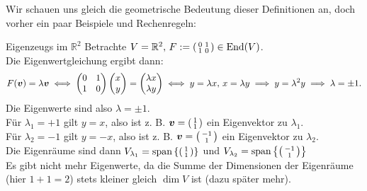 Wir schauen uns gleich die geometrische Bedeutung dieser Definitionen an, doch vorher ein paar Beispiele und Rechenregeln:
\begin{Beispiel}{Eigenzeugs im $\mathbb{R}^2$}
Betrachte $V=\mathbb{R}^2,\, F:=\left(\begin{smallmatrix}0&1\\1&0\end{smallmatrix}\right)\in \text{End}(V)$.\\
Die Eigenwertgleichung ergibt dann:
\begin{equation*}
F({\text{\boldmath${v}$}})=\lambda {\text{\boldmath${v}$}}\iff \begin{pmatrix}0&1\\1&0\end{pmatrix}\begin{pmatrix}x\\y\end{pmatrix}=\begin{pmatrix}\lambda x\\\lambda y\end{pmatrix}\iff y =\lambda x,\, x=\lambda y\implies y=\lambda^2 y\implies \lambda=\pm 1.
\end{equation*}
Die Eigenwerte sind also $\lambda=\pm 1$.\\
Für $\lambda_1=+1$ gilt $y=x$, also ist z. B. ${\text{\boldmath${v}$}}=\left(\begin{smallmatrix}1\\1\end{smallmatrix}\right)$ ein Eigenvektor zu $\lambda_1$.\\
Für $\lambda_2=-1$ gilt $y=-x$, also ist z. B. ${\text{\boldmath${v}$}}=\left(\begin{smallmatrix}-1\\1\end{smallmatrix}\right)$ ein Eigenvektor zu $\lambda_2$.\\
Die Eigenräume sind dann $V_{\lambda_1}=\text{span}\left\{\left(\begin{smallmatrix}1\\1\end{smallmatrix}\right)\right\}$ und $V_{\lambda_2}=\text{span}\left\{\left(\begin{smallmatrix}-1\\1\end{smallmatrix}\right)\right\}$\\
Es gibt nicht mehr Eigenwerte, da die Summe der Dimensionen der Eigenräume (hier $1+1=2$) stets kleiner gleich $\dim V$ ist (dazu später mehr).
\end{Beispiel}

